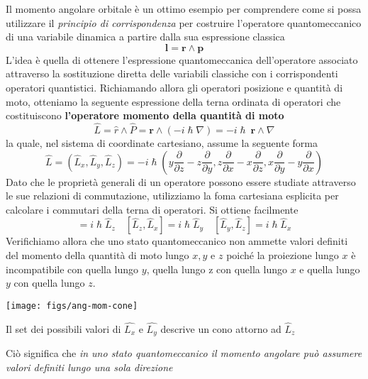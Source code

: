 Il momento angolare orbitale è un ottimo esempio per comprendere come si
possa utilizzare il \emph{principio di corrispondenza} per costruire
l'operatore quantomeccanico di una variabile dinamica a partire dalla
sua espressione classica
\[
    \bm{l}  = \bm{r} \wedge \bm{p}
\]
L'idea è quella di ottenere l'espressione quantomeccanica
dell'operatore associato attraverso la sostituzione diretta delle
variabili classiche con i corrispondenti operatori quantistici.
Richiamando allora gli operatori posizione e quantità di moto, otteniamo
la seguente espressione della terna ordinata di operatori che
costituiscono \textbf{l'operatore momento della quantità di moto}
\begin{equation}
    \hat{L} = \hat{r} \wedge \hat{P}=\bm{r} \wedge (- i \hslash \nabla) = - i \hslash \ \bm{r} \wedge \nabla
    \label{eq:momentum-operator-2}
\end{equation}
la quale, nel sistema di coordinate cartesiano, assume la seguente forma
\begin{equation}
    \hat{L} = (\hat{L}_{x}, \hat{L}_{y}, \hat{L}_{z}) = - i \hslash \left( y \frac{\partial}{\partial z} - z \frac{\partial}{\partial y},z \frac{\partial}{\partial x}-x \frac{\partial}{\partial z}, x \frac{\partial}{\partial y} - y \frac{\partial}{\partial x} \right)
    \label{eq:momentum-operator-cartesian-coordinates}
\end{equation}
Dato che le proprietà generali di un operatore possono essere
studiate attraverso le sue relazioni di commutazione, utilizziamo la
foma cartesiana esplicita per calcolare i commutari della terna di
operatori.
Si ottiene facilmente
\begin{equation}
    [\hat{L}_{x},\hat{L}_{y}] = i \hslash  \hat{L}_{z} \quad
    [\hat{L}_{z},\hat{L}_{x}] = i \hslash  \hat{L}_{y} \quad
    [\hat{L}_{y},\hat{L}_{z}] = i \hslash  \hat{L}_{x}
    \label{eq:commutators-momentum-operator}
\end{equation}
Verifichiamo allora che uno stato quantomeccanico non ammette valori
definiti del momento della quantità di moto lungo \(x, y\) e \(z\)
poiché la proiezione lungo \(x\) è incompatibile con quella lungo \(y\),
quella lungo z con quella lungo \(x\) e quella lungo \(y\) con quella
lungo \(z\).
\begin{marginfigure}
    \texttt{[image: figs/ang-mom-cone]}
    \caption{Il set dei possibili valori di $\hat{L_x}$ e $\hat{L_y}$ descrive un cono attorno ad $\hat{L}_z$}
    \label{fig:ang-mom-cone}
\end{marginfigure}
Ciò significa che \emph{in uno stato quantomeccanico il
momento angolare può assumere valori definiti lungo una sola direzione}
